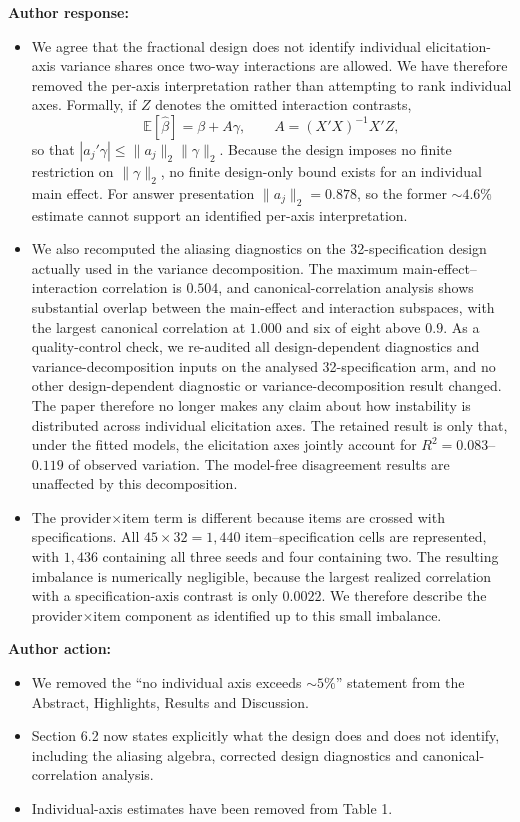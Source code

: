 \documentclass[11pt]{article}
\begin{document}
\textbf{Author response:}

\begin{itemize}
\item We agree that the fractional design does not identify individual elicitation-axis variance shares
once two-way interactions are allowed. We have therefore removed the per-axis interpretation rather
than attempting to rank individual axes. Formally, if $Z$ denotes the omitted interaction contrasts,
\[
\mathbb{E}[\hat{\beta}]=\beta+A\gamma,\qquad A=(X'X)^{-1}X'Z,
\]
so that $|a_j'\gamma|\leq\lVert a_j\rVert_2\lVert\gamma\rVert_2$. Because the design imposes no
finite restriction on $\lVert\gamma\rVert_2$, no finite design-only bound exists for an individual
main effect. For answer presentation $\lVert a_j\rVert_2=0.878$, so the former ${\sim}4.6\%$
estimate cannot support an identified per-axis interpretation.
\item We also recomputed the aliasing diagnostics on the 32-specification design actually used in the
variance decomposition. The maximum main-effect--interaction correlation is $0.504$, and
canonical-correlation analysis shows substantial overlap between the main-effect and interaction
subspaces, with the largest canonical correlation at $1.000$ and six of eight above $0.9$. As a
quality-control check, we re-audited all design-dependent diagnostics and variance-decomposition
inputs on the analysed 32-specification arm, and no other design-dependent diagnostic or variance-decomposition result changed. The
paper therefore no longer makes any claim about how instability is distributed across individual
elicitation axes. The retained result is only that, under the fitted models, the elicitation axes
jointly account for $R^2=0.083$--$0.119$ of observed variation. The model-free disagreement
results are unaffected by this decomposition.
\item The provider$\times$item term is different because items are crossed with specifications. All
$45\times32=1{,}440$ item--specification cells are represented, with $1{,}436$ containing all three
seeds and four containing two. The resulting imbalance is numerically negligible, because the
largest realized correlation with a specification-axis contrast is only $0.0022$. We therefore describe the
provider$\times$item component as identified up to this small imbalance.
\end{itemize}

\textbf{Author action:}

\begin{itemize}
\item We removed the ``no individual axis exceeds ${\sim}5\%$'' statement from the Abstract, Highlights, Results and Discussion.
\item Section 6.2 now states explicitly what the design does and does not identify, including the aliasing algebra, corrected design diagnostics and canonical-correlation analysis.
\item Individual-axis estimates have been removed from Table 1.
\end{itemize}
\end{document}
